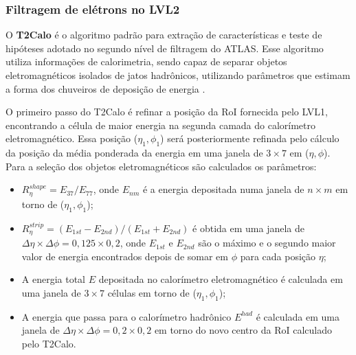 
\subsubsection{Filtragem de elétrons no LVL2}


O \textbf{T2Calo} \cite{TDR:ATLAS:2003} é o algoritmo padrão para
extração de características e teste de hipóteses adotado no
segundo nível de filtragem do ATLAS. Esse algoritmo utiliza
informações de calorimetria, sendo capaz de separar objetos
eletromagnéticos isolados de jatos hadrô\-nicos, utilizando
parâmetros que estimam a forma dos chuveiros de deposição de
energia \cite{TDR:ATLAS:2003}.

O primeiro passo do T2Calo é refinar a posição da RoI fornecida pelo
LVL1, encontrando a célula de maior energia na segunda camada do
calorímetro eletromagnético. Essa posição ($\eta_1 , \phi_1$) será
posteriormente refinada pelo cálculo da posição da média ponderada
da energia em uma janela de $3 \times 7$ em ($\eta , \phi$). Para a
seleção dos objetos eletromagnéticos são calculados os parâmetros:
\begin{itemize}
  \item $R_{\eta}^{shape}=E_{37}/E_{77}$, onde $E_{nm}$ é a energia
  depositada numa janela de $n \times m$ em torno de ($\eta_1 ,
  \phi_1$);

  \item $R_{\eta}^{strip}=(E_{1st}-E_{2nd})/(E_{1st}+E_{2nd})$ é
  obtida em uma janela de $\Delta \eta \times \Delta \phi=0,125 \times
  0,2$, onde $E_{1st}$ e $E_{2nd}$ são o máximo e o segundo maior
  valor de energia encontrados depois de somar em $\phi$ para cada posição
  $\eta$;

  \item A energia total $E$ depositada no calorímetro
  eletromagnético é calculada em uma janela de $3 \times 7$ células
  em torno de ($\eta_1 ,   \phi_1$);

  \item A energia que passa para o calorímetro hadrônico $E^{had}$ é
  calculada em uma janela de $\Delta \eta \times \Delta \phi=0,2 \times
  0,2$ em torno do novo centro da RoI calculado pelo T2Calo.

\end{itemize}


